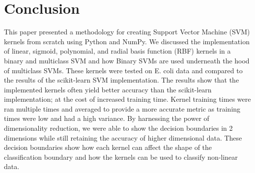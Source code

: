 \documentclass[12pt]{article}
\begin{document}
\section{Conclusion}
This paper presented a methodology for creating Support Vector Machine (SVM) kernels from scratch using Python and NumPy.
We discussed the implementation of linear, sigmoid, polynomial, and radial basis function (RBF) kernels in a binary and multiclass SVM
and how Binary SVMs are used underneath the hood of multiclass SVMs. These kernels were tested on E. coli data and compared to the results
of the scikit-learn SVM implementation. The results show that the implemented kernels often yield better accuracy than the scikit-learn
implementation; at the cost of increased training time. Kernel training times were ran multiple times and averaged to provide a more
accurate metric as training times were low and had a high variance. By harnessing the power of dimensionality reduction, we were
able to show the decision boundaries in 2 dimensions while still retaining the accuracy of higher dimensional data. These 
decision boundaries show how each kernel can affect the shape of the classification boundary and how the kernels can be used to
classify non-linear data.
\end{document}
